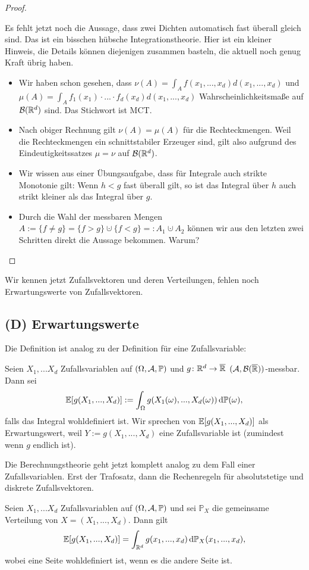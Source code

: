 \begin{proof}
\begin{itemize}
	Es fehlt jetzt noch die Aussage, dass zwei Dichten automatisch fast \"uberall gleich sind. Das ist ein bisschen h\"ubsche Integrationstheorie. Hier ist ein kleiner Hinweis, die Details k\"onnen diejenigen zusammen basteln, die aktuell noch genug Kraft \"ubrig haben. 
	\begin{itemize}
		\item Wir haben schon gesehen, dass $\nu(A)=\int_A f(x_1,...,x_d) d(x_1,...,x_d)$ und $\mu(A)=\int_A f_1(x_1)\cdot ... \cdot f_d(x_d) d(x_1,...,x_d)$ Wahrscheinlichkeitsma\ss e auf $\mathcal B(\mathbb{R}^d)$ sind. Das Stichwort ist MCT.
		\item Nach obiger Rechnung gilt $\nu(A)=\mu(A)$ f\"ur die Rechteckmengen. Weil die Rechteckmengen ein schnittstabiler Erzeuger sind, gilt also aufgrund des Eindeutigkeitssatzes $\mu=\nu$ auf $\mathcal B(\mathbb{R}^d)$.
		\item Wir wissen aus einer \"Ubungsaufgabe, dass f\"ur Integrale auch strikte Monotonie gilt: Wenn $h<g$ fast \"uberall gilt, so ist das Integral \"uber $h$ auch strikt kleiner als das Integral \"uber $g$. 
		\item Durch die Wahl der messbaren Mengen $A:=\{f\neq g\}=\{f>g\} \cupdot \{f<g\}=:A_1\cupdot A_2$ k\"onnen wir aus den letzten zwei Schritten direkt die Aussage bekommen. Warum?
	\end{itemize}
	\end{itemize}
\end{proof}
Wir kennen jetzt Zufallsvektoren und deren Verteilungen, fehlen noch Erwartungswerte von Zufallsvektoren.

\subsection*{(D) Erwartungswerte}
Die Definition ist analog zu der Definition f\"ur eine Zufallsvariable:
\begin{deff}
	Seien $X_1,...X_d$ Zufallsvariablen auf $(\Omega, \mathcal{A}, \mathbb{P})$ und $ g \colon \mathbb{R}^d \to \overline {\mathbb{R}}$ $(\mathcal A, \mathcal B(\overline {\mathbb{R}}))$-messbar. Dann sei 
	\[ \mathbb{E}[g(X_1,...,X_d)] := \int_{\Omega} g(X_1(\omega),...,X_d(\omega)) \, \mathrm{d} \mathbb{P}(\omega), \]
	falls das Integral wohldefiniert ist. Wir sprechen von $\mathbb{E}[g(X_1,...,X_d)]$ als Erwartungswert, weil $Y:= g(X_1,...,X_d)$ eine Zufallsvariable ist (zumindest wenn $g$ endlich ist).
\end{deff}
Die Berechnungstheorie geht jetzt komplett analog zu dem Fall einer Zufallsvariablen. Erst der Trafosatz, dann die Rechenregeln f\"ur absolutstetige und diskrete Zufallsvektoren.
\begin{lemma}\label{gemVert}
	Seien $X_1,...X_d$ Zufallsvariablen auf $(\Omega, \mathcal{A}, \mathbb{P})$ und sei $\mathbb{P}_X$ die gemeinsame Verteilung von $X = (X_1,...,X_d)$. Dann gilt \[ \mathbb{E}[g(X_1,...,X_d)] = \int_{\mathbb{R}^d} g(x_1,...,x_d) \, \mathrm{d} \mathbb{P}_X(x_1,...,x_d), \]
	wobei eine Seite wohldefiniert ist, wenn es die andere Seite ist.
\end{lemma}

